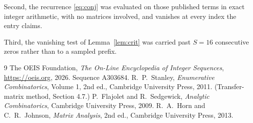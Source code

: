 \documentclass[11pt,a4paper]{article}
\theoremstyle{plain}
\theoremstyle{definition}
\begin{document}
Second, the recurrence \eqref{eq:conj} was evaluated on those published terms in exact
integer arithmetic, with no matrices involved, and vanishes at every index the entry claims.

Third, the vanishing test of Lemma~\ref{lem:crit} was carried past $S=16$ consecutive
zeros rather than to a sampled prefix.

\begin{thebibliography}{9}
 The OEIS Foundation, \emph{The On-Line Encyclopedia of Integer
Sequences}, \url{https://oeis.org}, 2026. Sequence A303684.
 R.~P.~Stanley, \emph{Enumerative Combinatorics}, Volume 1, 2nd ed.,
Cambridge University Press, 2011. (Transfer-matrix method, Section 4.7.)
 P.~Flajolet and R.~Sedgewick, \emph{Analytic Combinatorics}, Cambridge
University Press, 2009.
 R.~A.~Horn and C.~R.~Johnson, \emph{Matrix Analysis}, 2nd ed., Cambridge
University Press, 2013.
\end{thebibliography}
\end{document}
